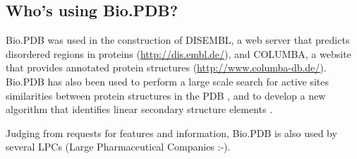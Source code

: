 \subsection{Who's using Bio.PDB?}

Bio.PDB was used in the construction of DISEMBL, a web server that
predicts disordered regions in proteins (\url{http://dis.embl.de/}),
and COLUMBA, a website that provides annotated protein structures
(\url{http://www.columba-db.de/}). Bio.PDB has also been used to
perform a large scale search for active sites similarities between
protein structures in the PDB \cite[Hamelryck, 2003]{hamelryck2003b}, and to develop a new algorithm
that identifies linear secondary structure elements \cite[Majumdar \textit{et al.}, 2005]{majumdar2005}.

Judging from requests for features and information, Bio.PDB is also
used by several LPCs (Large Pharmaceutical Companies :-).


